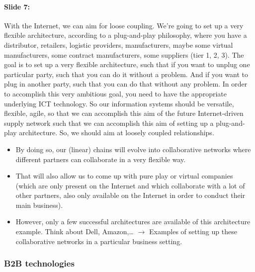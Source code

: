 \documentclass[10pt,a4paper]{report}
\begin{document}
\paragraph{Slide 7:}With the Internet, we can aim for loose coupling. We're going to set up a very flexible architecture, according to a plug-and-play philosophy, where you have a distributor, retailers, logistic providers, manufacturers, maybe some virtual manufacturers, some contract manufacturers, some suppliers (tier 1, 2, 3). The goal is to set up a very flexible architecture, such that if you want to unplug one particular party, such that you can do it without a problem. And if you want to plug in another party, such that you can do that without any problem. In order to accomplish this very ambitious goal, you need to have the appropriate underlying ICT technology. So our information systems should be versatile, flexible, agile, so that we can accomplish this aim of the future Internet-driven supply network such that we can accomplish this aim of setting up a plug-and-play architecture. So, we should aim at loosely coupled relationships. 
\begin{itemize}
\item By doing so, our (linear) chains will evolve into collaborative networks where different partners can collaborate in a very flexible way.
\item That will also allow us to come up with pure play or virtual companies (which are only present on the Internet and which collaborate with a lot of other partners, also only available on the Internet in order to conduct their main business).
\item However, only a few successful architectures are available of this architecture example. Think about Dell, Amazon,… $\rightarrow$ Examples of setting up these collaborative networks in a particular business setting.
\end{itemize}

\subsubsection{B2B technologies}
\end{document}
